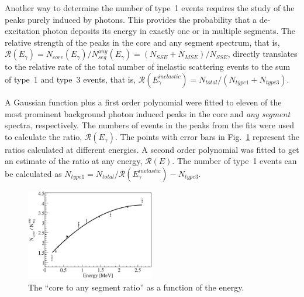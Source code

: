 Another way to determine the number of type~1 events requires the
study of the peaks purely induced by photons. This provides the
probability that a de-excitation photon deposits its energy in exactly
one or in multiple segments. The relative strength of the peaks in the
core and any segment spectrum, that is, $\mathcal{R}(E_{\gamma}) =
N_{core}(E_{\gamma}) / N^{any}_{seg}(E_{\gamma}) = (N_{SSE} + N_{MSE})
/ N_{SSE}$, directly translates to the relative rate of the total
number of inelastic scattering events to the sum of type~1 and type~3
events, that is, $\mathcal{R}(E_{\gamma}^{inelastic}) = N_{total} /
(N_{type1} + N_{type3})$.

A Gaussian function plus a first order polynomial were fitted to
eleven of the most prominent background photon induced peaks in the
core and \emph{any segment} spectra, respectively. The numbers of
events in the peaks from the fits were used to calculate the ratio,
$\mathcal{R}(E_{\gamma})$. The points with error bars in
Fig.~\ref{fig:neu:sf} represent the ratios calculated at different
energies. A second order polynomial was fitted to get an estimate of
the ratio at any energy, $\mathcal{R}(E)$. The number of type~1 events
can be calculated as $N_{type1} = N_{total} /
\mathcal{R}(E_{\gamma}^{inelastic}) - N_{type3}$.

\begin{figure}[tbhp]
  \centering
  \includegraphics[width=0.5\textwidth,clip]{sf}
  \caption{The ``core to any segment ratio'' as a function of the
    energy.}
  \label{fig:neu:sf}
\end{figure}

